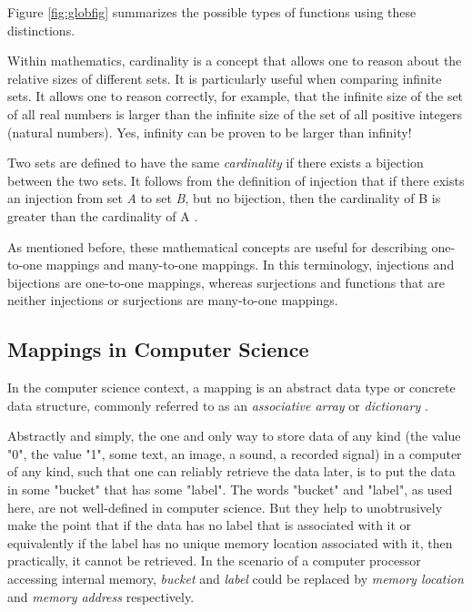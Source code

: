 Figure \ref{fig:globfig} summarizes the possible types of functions using these distinctions.

Within mathematics, cardinality is a concept that allows one to reason about the relative sizes of different sets. It is particularly useful when comparing infinite sets. It allows one to reason correctly, for example, that the infinite size of the set of all real numbers is larger than the infinite size of the set of all positive integers (natural numbers). Yes, infinity can be proven to be larger than infinity!

Two sets are defined to have the same \emph{cardinality} if there exists a bijection between the two sets. It follows from the definition of injection that if there exists an injection from set \emph{A} to set \emph{B}, but no bijection, then the cardinality of B is greater than the cardinality of A \cite{cardmath2010}.

As mentioned before, these mathematical concepts are useful for describing one-to-one mappings and many-to-one mappings. In this terminology, injections and bijections are one-to-one mappings, whereas surjections and functions that are neither injections or surjections are many-to-one mappings.

\subsection{Mappings in Computer Science}
\label{sec:Mappings in Computer Science}

In the computer science context, a mapping is an abstract data type or concrete data structure, commonly referred to as an \emph{associative array} or \emph{dictionary} \cite{assocarray2008}.  

Abstractly and simply, the one and only way to store data of any kind (the value "0", the value "1", some text, an image, a sound, a recorded signal) in a computer of any kind, such that one can reliably retrieve the data later, is to put the data in some "bucket" that has some "label". The words "bucket" and "label", as used here, are not well-defined in computer science. But they help to unobtrusively make the point that if the data has no label that is associated with it or equivalently if the label has no unique memory location associated with it, then practically, it cannot be retrieved. In the scenario of a computer processor accessing internal memory, \emph{bucket} and \emph{label} could be replaced by \emph{memory location} and \emph{memory address} respectively.

